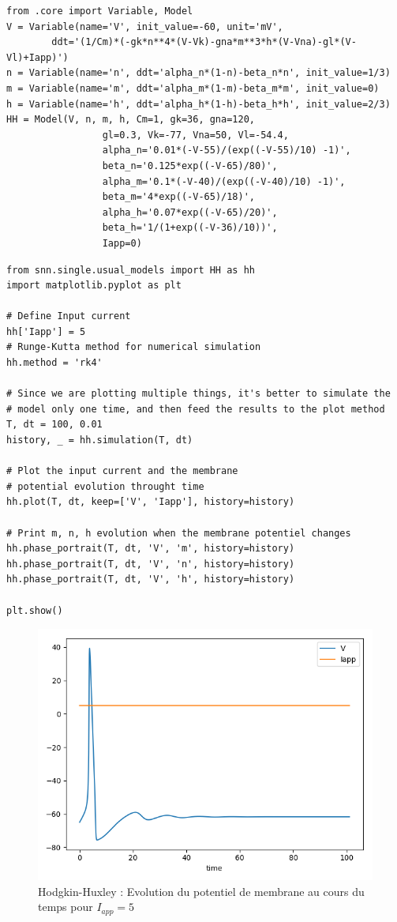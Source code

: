 \documentclass[12pt]{scrartcl}
\begin{document}
\begin{lstlisting}[caption = {Hodgkin-Huxley : Définition du modèle}]
from .core import Variable, Model
V = Variable(name='V', init_value=-60, unit='mV',
		ddt='(1/Cm)*(-gk*n**4*(V-Vk)-gna*m**3*h*(V-Vna)-gl*(V-Vl)+Iapp)')
n = Variable(name='n', ddt='alpha_n*(1-n)-beta_n*n', init_value=1/3)
m = Variable(name='m', ddt='alpha_m*(1-m)-beta_m*m', init_value=0)
h = Variable(name='h', ddt='alpha_h*(1-h)-beta_h*h', init_value=2/3)
HH = Model(V, n, m, h, Cm=1, gk=36, gna=120, 
				 gl=0.3, Vk=-77, Vna=50, Vl=-54.4, 
				 alpha_n='0.01*(-V-55)/(exp((-V-55)/10) -1)', 
				 beta_n='0.125*exp((-V-65)/80)',
				 alpha_m='0.1*(-V-40)/(exp((-V-40)/10) -1)', 
				 beta_m='4*exp((-V-65)/18)',
				 alpha_h='0.07*exp((-V-65)/20)',
				 beta_h='1/(1+exp((-V-36)/10))', 
				 Iapp=0)
\end{lstlisting}

\begin{lstlisting}[caption = {Hodgkin-Huxley : Simulation du modèle pour $I_{app} = 5$}]
from snn.single.usual_models import HH as hh
import matplotlib.pyplot as plt

# Define Input current
hh['Iapp'] = 5
# Runge-Kutta method for numerical simulation
hh.method = 'rk4'

# Since we are plotting multiple things, it's better to simulate the
# model only one time, and then feed the results to the plot method
T, dt = 100, 0.01
history, _ = hh.simulation(T, dt)

# Plot the input current and the membrane 
# potential evolution throught time
hh.plot(T, dt, keep=['V', 'Iapp'], history=history)

# Print m, n, h evolution when the membrane potentiel changes
hh.phase_portrait(T, dt, 'V', 'm', history=history)
hh.phase_portrait(T, dt, 'V', 'n', history=history)
hh.phase_portrait(T, dt, 'V', 'h', history=history)

plt.show()
\end{lstlisting}



\begin{figure}[!h]
\centering
\includegraphics[scale=0.5]{imgs/hh11.png}
\caption{Hodgkin-Huxley : Evolution du potentiel de membrane au cours du temps pour $I_{app} = 5$}
\label{hh11}
\end{figure}
\end{document}
